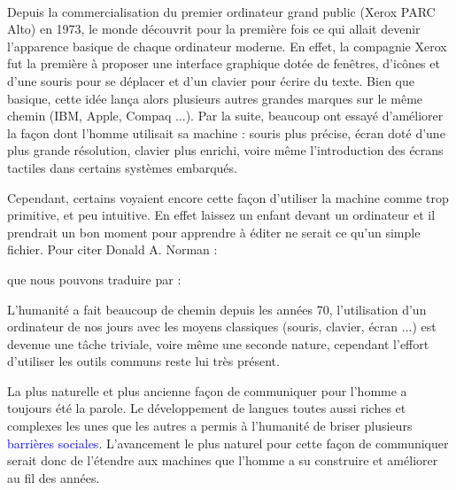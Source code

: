 \paragraph{}
Depuis la commercialisation du premier ordinateur grand public (Xerox PARC Alto) en 1973, le monde découvrit pour la première fois ce qui allait devenir l'apparence basique de chaque ordinateur moderne. En effet, la compagnie Xerox fut la première à proposer une interface graphique dotée de fenêtres, d'icônes et d'une souris pour se déplacer et d'un clavier pour écrire du texte. Bien que basique, cette idée lança alors plusieurs autres grandes marques sur le même chemin (IBM, Apple, Compaq ...). Par la suite, beaucoup ont essayé d'améliorer la façon dont l'homme utilisait sa machine : souris plus précise, écran doté d'une plus grande résolution, clavier plus enrichi, voire même l'introduction des écrans tactiles dans certains systèmes embarqués.
\par Cependant, certains voyaient encore cette façon d'utiliser la machine comme trop primitive, et peu intuitive. En effet laissez un enfant devant un ordinateur et il prendrait un bon moment pour apprendre à éditer ne serait ce qu'un simple fichier. Pour citer Donald A. Norman :
\begin{quote}
	\cite{don-norman}
\end{quote}
que nous pouvons traduire par :
\begin{quote}
\end{quote} 
L'humanité a fait beaucoup de chemin depuis les années 70, l'utilisation d'un ordinateur de nos jours avec les moyens classiques (souris, clavier, écran ...) est devenue une tâche triviale, voire même une seconde nature, 
cependant l'effort d'utiliser les outils communs reste lui très présent.
\par La plus naturelle et plus ancienne façon de communiquer pour l'homme a toujours été la parole. Le développement de langues toutes aussi riches et complexes les unes que les autres a permis à l'humanité de briser plusieurs \textcolor{blue}{barrières sociales}. L'avancement le plus naturel pour cette façon de communiquer serait donc de l'étendre aux machines que l'homme a su construire et améliorer au fil des années.
